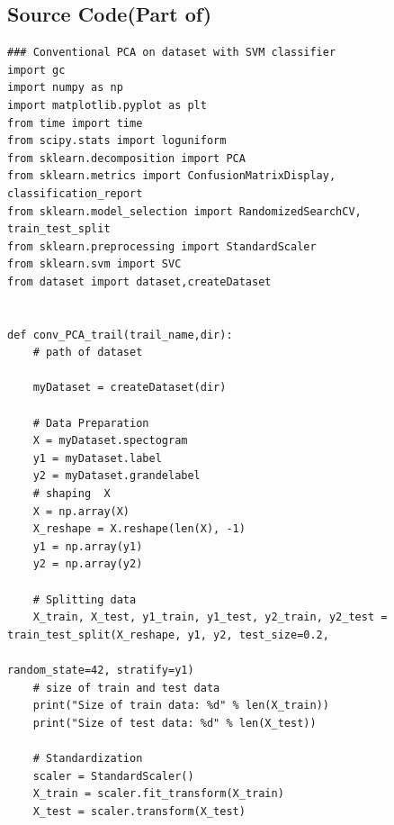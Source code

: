 \documentclass{cta-author}
\begin{document}
\subsection{Source Code(Part of)}
\lstset{language = Matlab}
\begin{lstlisting}
### Conventional PCA on dataset with SVM classifier
import gc
import numpy as np
import matplotlib.pyplot as plt
from time import time
from scipy.stats import loguniform
from sklearn.decomposition import PCA
from sklearn.metrics import ConfusionMatrixDisplay, classification_report
from sklearn.model_selection import RandomizedSearchCV, train_test_split
from sklearn.preprocessing import StandardScaler
from sklearn.svm import SVC
from dataset import dataset,createDataset


def conv_PCA_trail(trail_name,dir):
    # path of dataset

    myDataset = createDataset(dir)

    # Data Preparation
    X = myDataset.spectogram
    y1 = myDataset.label
    y2 = myDataset.grandelabel
    # shaping  X
    X = np.array(X)
    X_reshape = X.reshape(len(X), -1)
    y1 = np.array(y1)
    y2 = np.array(y2)

    # Splitting data
    X_train, X_test, y1_train, y1_test, y2_train, y2_test = train_test_split(X_reshape, y1, y2, test_size=0.2,
                                                                             random_state=42, stratify=y1)
    # size of train and test data
    print("Size of train data: %d" % len(X_train))
    print("Size of test data: %d" % len(X_test))

    # Standardization
    scaler = StandardScaler()
    X_train = scaler.fit_transform(X_train)
    X_test = scaler.transform(X_test)


\end{lstlisting}
\end{document}
